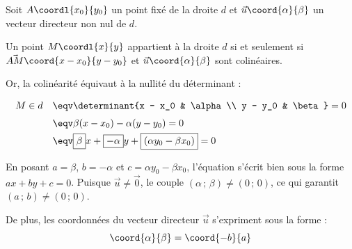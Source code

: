 \begin{demo}
	Soit $A\coordl{x_0}{y_0}$ un point fixé de la droite $d$ et $\vec{u}\coord{\alpha}{\beta}$ un vecteur directeur non nul de $d$.

	Un point $M\coordl{x}{y}$ appartient à la droite $d$ si et seulement si $\vec{AM}\coord{x - x_0}{y - y_0}$ et $\vec{u}\coord{\alpha}{\beta}$ sont colinéaires.

	Or, la colinéarité équivaut à la nullité du déterminant :
	\[
		\def\arraystretch{1.5}
		\begin{array}{rl}
			M \in d & \eqv \determinant{x - x_0                                                        & \alpha \\ y - y_0 & \beta} = 0 \\
			        & \eqv \beta(x - x_0) - \alpha(y - y_0) = 0                                                 \\
			        & \eqv \boxed{\beta} x + \boxed{- \alpha} y + \boxed{(\alpha y_0 - \beta x_0)} = 0
		\end{array}
	\]

	En posant $\boxed{a = \beta}$, $\boxed{b = -\alpha}$ et $\boxed{c = \alpha y_0 - \beta x_0}$, l'équation s'écrit bien sous la forme $ax + by + c = 0$. Puisque $\vec{u} \neq \vec{0}$, le couple $(\alpha\,;\,\beta) \neq (0\,;\,0)$, ce qui garantit $(a\,;\,b) \neq (0\,;\,0)$.

	\ms

	De plus, les coordonnées du vecteur directeur $\vec{u}$ s'expriment sous la forme :
	\[
		\coord{\alpha}{\beta} = \coord{-b}{a}
	\]
\end{demo}

